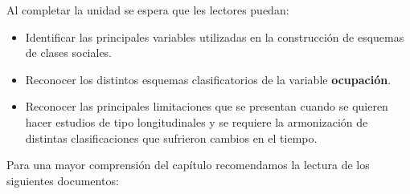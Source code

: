 \documentclass[
]{book}
\providecommand{\tightlist}{%
  \setlength{\itemsep}{0pt}\setlength{\parskip}{0pt}}
\begin{document}
Al completar la unidad se espera que les lectores puedan:

\begin{itemize}
\tightlist
\item
  Identificar las principales variables utilizadas en la construcción de esquemas de clases sociales.
\item
  Reconocer los distintos esquemas clasificatorios de la variable \textbf{ocupación}.
\item
  Reconocer las principales limitaciones que se presentan cuando se quieren hacer estudios de tipo longitudinales y se requiere la armonización de distintas clasificaciones que sufrieron cambios en el tiempo.
\end{itemize}

Para una mayor comprensión del capítulo recomendamos la lectura de los siguientes documentos:
\end{document}
